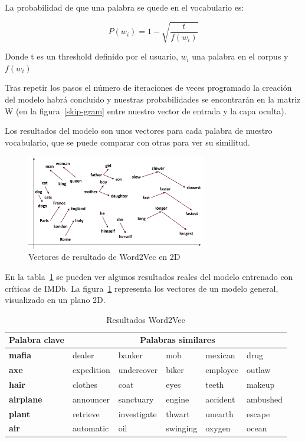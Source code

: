 \documentclass[withindex, glossary]{cam-thesis}
\begin{document}
La probabilidad de que una palabra se quede en el vocabulario es:

\begin{equation}
    P(w_i) = 1 - \sqrt{\dfrac{t}{f(w_i)}}
\end{equation}

Donde t es un threshold definido por el usuario, $w_i$ una palabra en el corpus y $f(w_i)$

Tras repetir los pasos el número de iteraciones de veces programado la creación del modelo habrá concluido y nuestras probabilidades se encontrarán en la matriz W (en la figura~\ref{skip-gram} entre nuestro vector de entrada y la capa oculta).

Los resultados del modelo son unos vectores para cada palabra de nuestro vocabulario, que se puede comparar con otras para ver su similitud.

\begin{figure}[!htbp]
    \centering
    \includegraphics[width=0.7\textwidth]{./figures/res-w2v.png}
    \caption{Vectores de resultado de Word2Vec en 2D\cite{nlp-gensim}}\label{w2v-general}
\end{figure}

En la tabla~\ref{tab:w2v-res} se pueden ver algunos resultados reales del modelo entrenado con críticas de IMDb. La figura~\ref{w2v-general} representa los vectores de un modelo general, visualizado en un plano 2D.

\begin{table}
    \begin{tabularx}{\textwidth}{XXXXXX}
        \toprule
        \hiderowcolors{}Palabra clave & \multicolumn{5}{c}{Palabras similares}\\
        \midrule
        \showrowcolors{}\textbf{mafia} & dealer & banker & mob & mexican & drug\\
        \textbf{axe} & expedition & undercover & biker & employee & outlaw\\
        \textbf{hair} & clothes & coat & eyes & teeth & makeup\\
        \textbf{airplane} & announcer & sanctuary & engine & accident & ambushed\\
        \textbf{plant} & retrieve & investigate & thwart & unearth & escape\\
        \textbf{air} & automatic & oil & swinging & oxygen & ocean\\
        \bottomrule
    \end{tabularx}
    \caption{Resultados Word2Vec}\label{tab:w2v-res}
\end{table}
\end{document}
